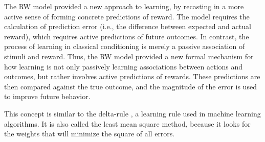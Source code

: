 The RW model provided a new approach to learning, by recasting in a more active sense of forming concrete predictions of reward. The model requires the calculation of prediction error (i.e., the difference between expected and actual reward), which requires active predictions of future outcomes. In contrast, the process of learning in classical conditioning is merely a passive association of stimuli and reward. Thus, the RW model provided a new formal mechanism for how learning is not only passively learning associations between actions and outcomes, but rather involves active predictions of rewards. These predictions are then compared against the true outcome, and the magnitude of the error is used to improve future behavior. %

This concept is similar to the delta-rule \citep{widrow1960adaptive}, a learning rule used in machine learning algorithms. %
It is also called the least mean square method, because it looks for the weights that will minimize the square of all errors.  %


